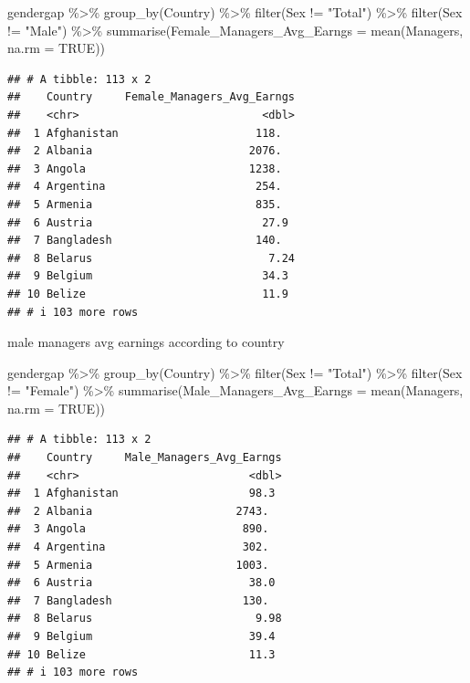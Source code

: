 \documentclass[
]{article}
\newenvironment{Shaded}{\begin{snugshade}}{\end{snugshade}}
\newcommand{\AttributeTok}[1]{\textcolor[rgb]{0.77,0.63,0.00}{#1}}
\newcommand{\ConstantTok}[1]{\textcolor[rgb]{0.00,0.00,0.00}{#1}}
\newcommand{\FunctionTok}[1]{\textcolor[rgb]{0.00,0.00,0.00}{#1}}
\newcommand{\NormalTok}[1]{#1}
\newcommand{\SpecialCharTok}[1]{\textcolor[rgb]{0.00,0.00,0.00}{#1}}
\newcommand{\StringTok}[1]{\textcolor[rgb]{0.31,0.60,0.02}{#1}}
\begin{document}
\begin{Shaded}
\begin{Highlighting}[]
\NormalTok{gendergap }\SpecialCharTok{\%\textgreater{}\%}
  \FunctionTok{group\_by}\NormalTok{(Country) }\SpecialCharTok{\%\textgreater{}\%} 
   \FunctionTok{filter}\NormalTok{(Sex }\SpecialCharTok{!=} \StringTok{"Total"}\NormalTok{) }\SpecialCharTok{\%\textgreater{}\%}
  \FunctionTok{filter}\NormalTok{(Sex }\SpecialCharTok{!=} \StringTok{"Male"}\NormalTok{) }\SpecialCharTok{\%\textgreater{}\%}
  \FunctionTok{summarise}\NormalTok{(}\AttributeTok{Female\_Managers\_Avg\_Earngs =} \FunctionTok{mean}\NormalTok{(Managers, }\AttributeTok{na.rm =} \ConstantTok{TRUE}\NormalTok{))}
\end{Highlighting}
\end{Shaded}

\begin{verbatim}
## # A tibble: 113 x 2
##    Country     Female_Managers_Avg_Earngs
##    <chr>                            <dbl>
##  1 Afghanistan                     118.  
##  2 Albania                        2076.  
##  3 Angola                         1238.  
##  4 Argentina                       254.  
##  5 Armenia                         835.  
##  6 Austria                          27.9 
##  7 Bangladesh                      140.  
##  8 Belarus                           7.24
##  9 Belgium                          34.3 
## 10 Belize                           11.9 
## # i 103 more rows
\end{verbatim}

male managers avg earnings according to country

\begin{Shaded}
\begin{Highlighting}[]
\NormalTok{gendergap }\SpecialCharTok{\%\textgreater{}\%}
  \FunctionTok{group\_by}\NormalTok{(Country) }\SpecialCharTok{\%\textgreater{}\%} 
   \FunctionTok{filter}\NormalTok{(Sex }\SpecialCharTok{!=} \StringTok{"Total"}\NormalTok{) }\SpecialCharTok{\%\textgreater{}\%}
  \FunctionTok{filter}\NormalTok{(Sex }\SpecialCharTok{!=} \StringTok{"Female"}\NormalTok{) }\SpecialCharTok{\%\textgreater{}\%}
  \FunctionTok{summarise}\NormalTok{(}\AttributeTok{Male\_Managers\_Avg\_Earngs =} \FunctionTok{mean}\NormalTok{(Managers, }\AttributeTok{na.rm =} \ConstantTok{TRUE}\NormalTok{))}
\end{Highlighting}
\end{Shaded}

\begin{verbatim}
## # A tibble: 113 x 2
##    Country     Male_Managers_Avg_Earngs
##    <chr>                          <dbl>
##  1 Afghanistan                    98.3 
##  2 Albania                      2743.  
##  3 Angola                        890.  
##  4 Argentina                     302.  
##  5 Armenia                      1003.  
##  6 Austria                        38.0 
##  7 Bangladesh                    130.  
##  8 Belarus                         9.98
##  9 Belgium                        39.4 
## 10 Belize                         11.3 
## # i 103 more rows
\end{verbatim}
\end{document}
